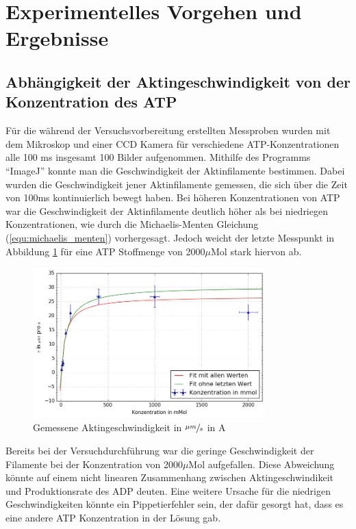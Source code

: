 \section{Experimentelles Vorgehen und Ergebnisse}
\subsection{Abhängigkeit der Aktingeschwindigkeit von der Konzentration des ATP}
Für die während der Versuchsvorbereitung erstellten Messproben wurden mit dem Mikroskop und einer CCD Kamera für verschiedene ATP-Konzentrationen alle
100 ms insgesamt 100 Bilder aufgenommen. Mithilfe des Programms "`ImageJ"' konnte man die Geschwindigkeit
der Aktinfilamente bestimmen. Dabei wurden die Geschwindigkeit jener Aktinfilamente gemessen, die
sich über die Zeit von 100ms kontinuierlich bewegt haben. Bei höheren Konzentrationen von ATP war die
Geschwindigkeit der Aktinfilamente deutlich höher als bei niedriegen Konzentrationen,
wie durch die Michaelis-Menten Gleichung (\ref{equ:michaelis_menten}) vorhergesagt.
Jedoch weicht der letzte Messpunkt in Abbildung \ref{fig:normal_speed} für eine ATP Stoffmenge
von 2000$\mu \text{Mol}$ stark hiervon ab.
\begin{figure}[h]
  \centering
  \includegraphics[width=0.8\textwidth]{bilder/both_fits.png}
  \caption{Gemessene Aktingeschwindigkeit in $\sfrac{\mu m}{s}$ in A}
  \label{fig:normal_speed}
\end{figure}
Bereits bei der Versuchdurchführung war die geringe Geschwindigkeit der Filamente bei der
Konzentration von 2000$\mu \text{Mol}$ aufgefallen.
Diese Abweichung könnte auf einem nicht linearen Zusammenhang zwischen
Aktingeschwindikeit und Produktionsrate des ADP deuten.
Eine weitere Ursache für die niedrigen Geschwindigkeiten könnte ein Pippetierfehler sein,
der dafür gesorgt hat, dass es eine andere ATP Konzentration in der Lösung gab.\newline 
